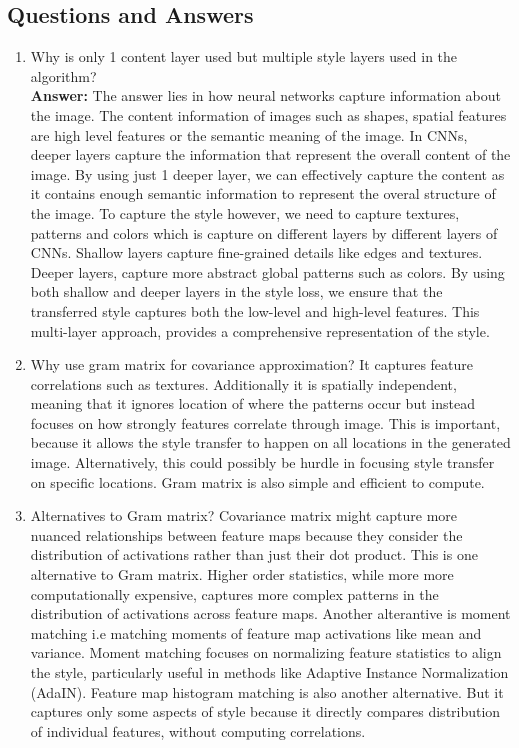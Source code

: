 \documentclass{article}
\begin{document}
\subsection{Questions and Answers}

\begin{enumerate}
	\item Why is only 1 content layer used but multiple style layers used in the algorithm?\\
	\textbf{Answer: } The answer lies in how neural networks capture information about the image. The content information 
	of images such as shapes, spatial features are high level features or the semantic meaning of the image. In CNNs, deeper layers
	capture the information that represent the overall content of the image. By using just 1 deeper layer, we can effectively capture the content
	as it contains enough semantic information to represent the overal structure of the image. To capture the style however,
	we need to capture textures, patterns and colors which is capture on different layers by different layers of CNNs. Shallow
	layers capture fine-grained details like edges and textures. Deeper layers, capture more abstract global patterns such as colors.
	By using both shallow and deeper layers in the style loss, we ensure that the transferred style captures both the low-level
	and high-level features. This multi-layer approach, provides a comprehensive representation of the style.
	\item Why use gram matrix for covariance approximation?
	It captures feature correlations such as textures. Additionally it is spatially independent, meaning that it ignores
	location of where the patterns occur but instead focuses on how strongly features correlate through image. This is important,
	because it allows the style transfer to happen on all locations in the generated image. Alternatively, this could possibly
	be hurdle in focusing style transfer on specific locations. Gram matrix is also simple and efficient to compute.
	\item Alternatives to Gram matrix?
	Covariance matrix might capture more nuanced relationships between feature maps because they consider the distribution
	of activations rather than just their dot product. This is one alternative to Gram matrix. Higher order statistics,
	while more more computationally expensive, captures more complex patterns in the distribution of activations across feature maps.
	Another alterantive is moment matching i.e matching moments of feature map activations like mean and variance. Moment matching focuses
	on normalizing feature statistics to align the style, particularly useful in methods like Adaptive Instance Normalization (AdaIN). Feature map
	histogram matching is also another alternative. But it captures only some aspects of style because it directly compares distribution
	of individual features, without computing correlations.
\end{enumerate}
\end{document}
